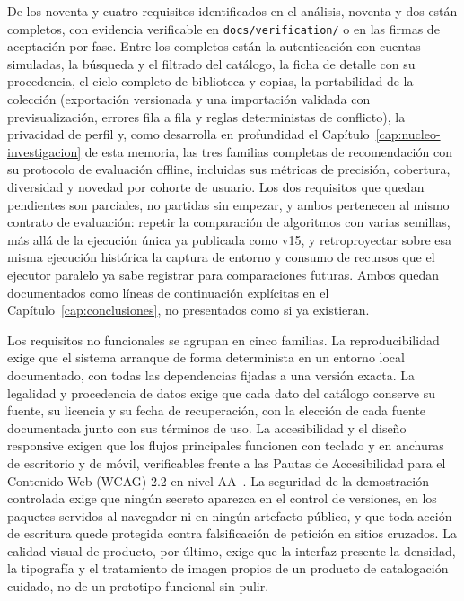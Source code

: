 De los noventa y cuatro requisitos identificados en el análisis, noventa y dos están
completos, con evidencia verificable en \texttt{docs/verification/} o en las firmas de
aceptación por fase. Entre los completos están la autenticación con cuentas simuladas, la
búsqueda y el filtrado del catálogo, la ficha de detalle con su procedencia, el ciclo completo
de biblioteca y copias, la portabilidad de la colección (exportación versionada y una
importación validada con previsualización, errores fila a fila y reglas deterministas de
conflicto), la privacidad de perfil y, como desarrolla en profundidad el
Capítulo~\ref{cap:nucleo-investigacion} de esta memoria, las tres familias completas de
recomendación con su protocolo de evaluación offline, incluidas sus métricas de precisión,
cobertura, diversidad y novedad por cohorte de usuario. Los dos requisitos que quedan
pendientes son parciales, no partidas sin empezar, y ambos pertenecen al mismo contrato de
evaluación: repetir la comparación de algoritmos con varias semillas, más allá de la ejecución
única ya publicada como v15, y retroproyectar sobre esa misma ejecución histórica la captura de
entorno y consumo de recursos que el ejecutor paralelo ya sabe registrar para comparaciones
futuras. Ambos quedan documentados como líneas de continuación explícitas en el
Capítulo~\ref{cap:conclusiones}, no presentados como si ya existieran.

Los requisitos no funcionales se agrupan en cinco familias. La reproducibilidad exige que el
sistema arranque de forma determinista en un entorno local documentado, con todas las
dependencias fijadas a una versión exacta. La legalidad y procedencia de datos exige que cada
dato del catálogo conserve su fuente, su licencia y su fecha de recuperación, con la elección
de cada fuente documentada junto con sus términos de uso. La accesibilidad y el diseño
responsive exigen que los flujos principales funcionen con teclado y en anchuras de
escritorio y de móvil, verificables frente a las Pautas de Accesibilidad para el Contenido Web
(WCAG) 2.2 en nivel AA~\cite{wcag22}. La seguridad de la demostración controlada exige que
ningún secreto aparezca en el control de versiones, en los paquetes servidos al navegador ni
en ningún artefacto público, y que toda acción de escritura quede protegida contra
falsificación de petición en sitios cruzados. La calidad visual de producto, por último, exige
que la interfaz presente la densidad, la tipografía y el tratamiento de imagen propios de un
producto de catalogación cuidado, no de un prototipo funcional sin pulir.

